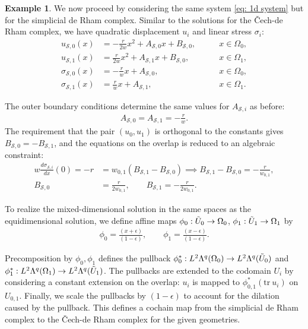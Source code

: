\documentclass[reqno]{amsart}
\numberwithin{equation}{section}
\theoremstyle{definition}
\newtheorem{example}{Example}
\newcommand{\Sc}{\mathcal{S}}
\newcommand{\tr}{\mathrm{tr}}
\begin{document}
\begin{example}

We now proceed by considering the same system \cref{eq: 1d system} but for the simplicial de Rham complex. Similar to the solutions for the \v{C}ech-de Rham complex, we have quadratic displacement $u_i$ and linear stress $\sigma_i$:
\begin{subequations}
\begin{align}
u_{\Sc,0}(x) &= -\frac{r}{2w}x^2 + A_{\Sc,0} x + B_{\Sc,0}, \qquad &x \in \Omega_0, \\
u_{\Sc,1}(x) &= \frac{r}{2w}x^2 +A_{\Sc,1}x + B_{\Sc,0}, \qquad &x \in \Omega_1,\\ 
\sigma_{\Sc,0}(x) &= -\frac{r}{w}x + A_{\Sc,0}, \qquad &x \in \Omega_0, \\
\sigma_{\Sc,1}(x) &= \frac{r}{w}x+A_{\Sc,1}, \qquad &x \in \Omega_1.
\end{align}
\end{subequations}

The outer boundary conditions determine the same values for $A_{\Sc,i}$ as before:
\begin{align}
A_{\Sc,0} = A_{\Sc,1} = -\frac{r}{w}.
\end{align}
The requirement that the pair $(u_0, u_1)$ is orthogonal to the constants gives $B_{\Sc,0} = -B_{\Sc,1}$, and the equations on the overlap is reduced to an algebraic constraint:
\begin{subequations}
\begin{align}    
 w\frac{d\sigma_{\Sc,i}}{dx}(0) = -r &= w_{0,1} (B_{\Sc,1} - B_{\Sc,0}) \implies B_{\Sc,1} - B_{\Sc,0} = -\frac{r}{w_{0,1}}, \\
 B_{\Sc,0} &= \frac{r}{2 w_{0,1}}, \qquad  B_{\Sc,1} = -\frac{r}{2 w_{0,1}}.
\end{align}
\end{subequations}




To realize the mixed-dimensional solution in the same spaces as the equidimensional solution, we define affine maps $\phi_0: \Tilde{U}_0 \to \Omega_0$, $\phi_1: \Tilde{U}_1 \to \Omega_1$ by
\begin{subequations}
\begin{align}
\phi_0 = \frac{(x + \epsilon)}{(1 - \epsilon)}, \qquad \phi_1 = \frac{(x - \epsilon)}{(1 - \epsilon)}. 
\end{align}
\end{subequations}

Precomposition by $\phi_0, \phi_1$ defines the pullback $\phi^*_0: L^2\Lambda^q(\Omega_0) \to L^2\Lambda^q(\Tilde{U}_0)$ and $\phi^*_1: L^2\Lambda^q(\Omega_1) \to L^2\Lambda^q(\Tilde{U}_1)$. The pullbacks are extended to the codomain $U_i$ by considering a constant extension on the overlap: $u_i$ is mapped to $\phi_{0,1}^*(\tr \: u_i)$ on $U_{0,1}$. Finally, we scale the pullbacks by $(1-\epsilon)$ to account for the dilation caused by the pullback. This defines a cochain map from the simplicial de Rham complex to the \v{C}ech-de Rham complex for the given geometries. 




\end{example}
\end{document}
